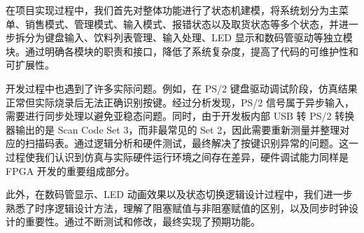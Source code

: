 \documentclass{article}
\begin{document}
在项目实现过程中，我们首先对整体功能进行了状态机建模，将系统划分为主菜单、销售模式、管理模式、输入模式、报错状态以及取货状态等多个状态，并进一步拆分为键盘输入、饮料列表管理、输入处理、LED 显示和数码管驱动等独立模块。通过明确各模块的职责和接口，降低了系统复杂度，提高了代码的可维护性和可扩展性。

开发过程中也遇到了许多实际问题。例如，在 PS/2 键盘驱动调试阶段，仿真结果正常但实际烧录后无法正确识别按键。经过分析发现，PS/2 信号属于异步输入，需要进行同步处理以避免亚稳态问题。同时，由于开发板内部 USB 转 PS/2 转换器输出的是 Scan Code Set 3，而非最常见的 Set 2，因此需要重新测量并整理对应的扫描码表。通过逻辑分析和硬件测试，最终解决了按键识别异常的问题。这一过程使我们认识到仿真与实际硬件运行环境之间存在差异，硬件调试能力同样是 FPGA 开发的重要组成部分。

此外，在数码管显示、LED 动画效果以及状态切换逻辑设计过程中，我们进一步熟悉了时序逻辑设计方法，理解了阻塞赋值与非阻塞赋值的区别，以及同步时钟设计的重要性。通过不断测试和修改，最终实现了预期功能。
\end{document}
